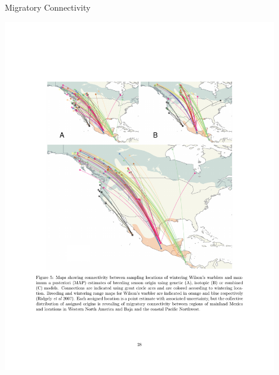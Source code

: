 \documentclass[11pt,ignorenonframetext,]{beamer}
\begin{document}
\begin{frame}{Migratory Connectivity}
\protect\hypertarget{migratory-connectivity}{}

\begin{center}
\includegraphics[width=0.9\textwidth]{figs/wintering.pdf}
\end{center}

\end{frame}
\end{document}
